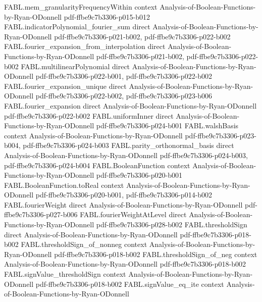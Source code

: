 \begin{theorem}
\proofstep
  {FABL.mem_granularityFrequencyWithin}
  {context}
  {Analysis-of-Boolean-Functions-by-Ryan-ODonnell}
  {pdf-ffbe9c7b3306-p015-b012}
\proofstep
  {FABL.indicatorPolynomial_fourier_sum}
  {direct}
  {Analysis-of-Boolean-Functions-by-Ryan-ODonnell}
  {pdf-ffbe9c7b3306-p021-b002,
    pdf-ffbe9c7b3306-p022-b002}
\proofstep
  {FABL.fourier_expansion_from_interpolation}
  {direct}
  {Analysis-of-Boolean-Functions-by-Ryan-ODonnell}
  {pdf-ffbe9c7b3306-p021-b002,
    pdf-ffbe9c7b3306-p022-b002}
\proofstep
  {FABL.multilinearPolynomial}
  {direct}
  {Analysis-of-Boolean-Functions-by-Ryan-ODonnell}
  {pdf-ffbe9c7b3306-p022-b001,
    pdf-ffbe9c7b3306-p022-b002}
\proofstep
  {FABL.fourier_expansion_unique}
  {direct}
  {Analysis-of-Boolean-Functions-by-Ryan-ODonnell}
  {pdf-ffbe9c7b3306-p022-b002,
    pdf-ffbe9c7b3306-p023-b006}
\proofstep
  {FABL.fourier_expansion}
  {direct}
  {Analysis-of-Boolean-Functions-by-Ryan-ODonnell}
  {pdf-ffbe9c7b3306-p022-b002}
\proofstep
  {FABL.uniformInner}
  {direct}
  {Analysis-of-Boolean-Functions-by-Ryan-ODonnell}
  {pdf-ffbe9c7b3306-p024-b001}
\proofstep
  {FABL.walshBasis}
  {context}
  {Analysis-of-Boolean-Functions-by-Ryan-ODonnell}
  {pdf-ffbe9c7b3306-p023-b004,
    pdf-ffbe9c7b3306-p024-b003}
\proofstep
  {FABL.parity_orthonormal_basis}
  {direct}
  {Analysis-of-Boolean-Functions-by-Ryan-ODonnell}
  {pdf-ffbe9c7b3306-p024-b003,
    pdf-ffbe9c7b3306-p024-b004}
\proofstep
  {FABL.BooleanFunction}
  {context}
  {Analysis-of-Boolean-Functions-by-Ryan-ODonnell}
  {pdf-ffbe9c7b3306-p020-b001}
\proofstep
  {FABL.BooleanFunction.toReal}
  {context}
  {Analysis-of-Boolean-Functions-by-Ryan-ODonnell}
  {pdf-ffbe9c7b3306-p020-b001,
    pdf-ffbe9c7b3306-p014-b002}
\proofstep
  {FABL.fourierWeight}
  {direct}
  {Analysis-of-Boolean-Functions-by-Ryan-ODonnell}
  {pdf-ffbe9c7b3306-p027-b006}
\proofstep
  {FABL.fourierWeightAtLevel}
  {direct}
  {Analysis-of-Boolean-Functions-by-Ryan-ODonnell}
  {pdf-ffbe9c7b3306-p028-b002}
\proofstep
  {FABL.thresholdSign}
  {direct}
  {Analysis-of-Boolean-Functions-by-Ryan-ODonnell}
  {pdf-ffbe9c7b3306-p018-b002}
\proofstep
  {FABL.thresholdSign_of_nonneg}
  {context}
  {Analysis-of-Boolean-Functions-by-Ryan-ODonnell}
  {pdf-ffbe9c7b3306-p018-b002}
\proofstep
  {FABL.thresholdSign_of_neg}
  {context}
  {Analysis-of-Boolean-Functions-by-Ryan-ODonnell}
  {pdf-ffbe9c7b3306-p018-b002}
\proofstep
  {FABL.signValue_thresholdSign}
  {context}
  {Analysis-of-Boolean-Functions-by-Ryan-ODonnell}
  {pdf-ffbe9c7b3306-p018-b002}
\proofstep
  {FABL.signValue_eq_ite}
  {context}
  {Analysis-of-Boolean-Functions-by-Ryan-ODonnell}

\end{theorem}
